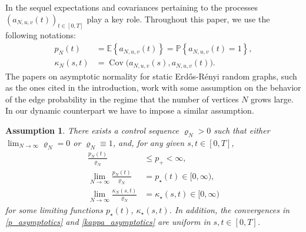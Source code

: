 \documentclass[11pt,reqno]{amsart}
\numberwithin{equation}{section}
\newcommand{\E}[1]{\mathbb{E}\left\{ #1\right\}}
\newcommand{\pk}[1]{\mathbb{P} \left\{ #1 \right \} }
\newtheorem{ass}[theo]{Assumption}
\begin{document}
\medskip

In the sequel expectations and covariances pertaining to the processes $(a_{N,u,v}(t))_{t\in[0,T]}$ play a key role. Throughout this paper, we use the following notations:
\begin{align*}
    p_N(t) &= \E{a_{N,u,v}(t)} = \pk{a_{N,u,v}(t)  =1},\\
    \kappa_N(s,t) &= \operatorname{Cov}\bigl(a_{N,u,v}(s), a_{N,u,v}(t)\bigr).
\end{align*}
The papers on asymptotic normality for static Erd\H{o}s-R\'{e}nyi random graphs, such as the ones cited in the introduction, work with some assumption on the behavior of the edge probability in the regime that the number of vertices $N$ grows large. 
In our dynamic counterpart we have to impose a similar assumption.
\begin{ass}\label{ass:ass1}
There exists a control sequence $\varrho_N>0$ such that either $\lim_{N\to\infty}\varrho_N = 0$ or $\varrho_N\equiv 1$, and, for any given $s,t\in[0,T]$,
\begin{align} 
     \frac{p_N(t)}{\varrho_N}&\leqslant p_+<\infty,\label{p_star_bound}\\
    \lim_{N\to\infty}\frac{p_N(t)}{\varrho_N}&=p_{\star}(t)\in[0,\infty),\label{p_asymptotics}\\
    \lim_{N\to\infty}\frac{\kappa_N(s,t)}{\varrho_N}& = \kappa_{\star}(s,t)\in[0,\infty)\label{kappa_asymptotics}
\end{align} 
for {some limiting functions} $p_{\star}(t)$, $\kappa_{\star}(s,t)$. In addition, the convergences in \eqref{p_asymptotics} and \eqref{kappa_asymptotics} are uniform in $s,t\in[0,T]$. 
\end{ass}
\end{document}
